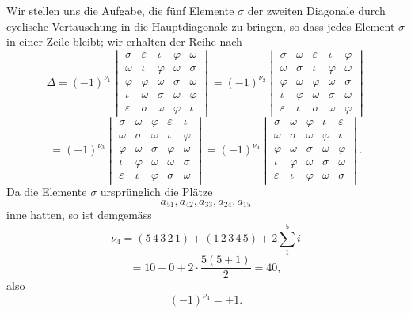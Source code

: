 Wir stellen uns die Aufgabe, die f\"unf Elemente $\sigma$ der zweiten Diagonale
durch cyclische Vertauschung in die Hauptdiagonale zu bringen, so dass jedes
Element $\sigma$ in einer Zeile bleibt; wir erhalten der Reihe nach
\[
\Delta = (-1)^{\nu_1}
\begin{vmatrix}
\sigma & \varepsilon & \iota & \varphi & \omega \\
\omega & \iota & \varphi & \omega & \sigma \\
\varphi & \varphi & \omega & \sigma & \omega \\
\iota & \omega & \sigma & \omega & \varphi \\
\varepsilon & \sigma & \omega & \varphi & \iota
\end{vmatrix}
=
(-1)^{\nu_2}
\begin{vmatrix}
\sigma & \omega & \varepsilon & \iota & \varphi \\
\omega & \sigma & \iota & \varphi & \omega \\
\varphi & \omega & \varphi & \omega & \sigma \\
\iota & \varphi & \omega & \sigma & \omega \\
\varepsilon & \iota & \sigma & \omega & \varphi
\end{vmatrix}
\]
\[
= (-1)^{\nu_3}
\begin{vmatrix}
\sigma & \omega & \varphi & \varepsilon & \iota \\
\omega & \sigma & \omega & \iota & \varphi \\
\varphi & \omega & \sigma & \varphi & \omega \\
\iota & \varphi & \omega & \omega & \sigma \\
\varepsilon & \iota & \varphi & \sigma & \omega
\end{vmatrix}
=
(-1)^{\nu_4}
\begin{vmatrix}
\sigma & \omega & \varphi & \iota & \varepsilon \\
\omega & \sigma & \omega & \varphi & \iota \\
\varphi & \omega & \sigma & \omega & \varphi \\
\iota & \varphi & \omega & \sigma & \omega \\
\varepsilon & \iota & \varphi & \omega & \sigma
\end{vmatrix}.
\]
Da die Elemente $\sigma$ urspr\"unglich die Pl\"atze
\[
a_{51}, a_{42}, a_{33}, a_{24}, a_{15}
\]
inne hatten, so ist demgem\"ass
\[
\nu_4 = (5\,4\,3\,2\,1) + (1\,2\,3\,4\,5) + 2\sum_1^5 i
\]
\[
= 10 + 0 + 2\cdot\frac{5(5+1)}{2} = 40,
\]
also
\[
(-1)^{\nu_4} = +1.
\]

